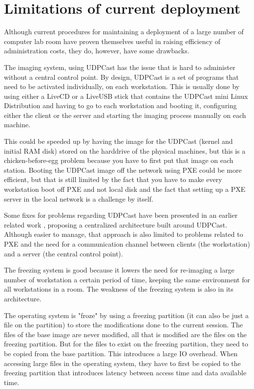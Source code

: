 \section{Limitations of current deployment}


Although current procedures for maintaining a deployment of a large
number of computer lab room have proven themselves useful in raising
efficiency of administration costs, they do, however, have some
drawbacks.

The imaging system, using UDPCast has the issue that is hard to
administer without a central control point. By design, UDPCast is a set
of programs that need to be activated individually, on each workstation.
This is usually done by using either a LiveCD or a LiveUSB stick that
contains the UDPCast mini Linux Distribution and having to go to each
workstation and booting it, configuring either the client or the server
and starting the imaging process manually on each machine.

This could be speeded up by having the image for the UDPCast (kernel and
initial RAM disk) stored on the harddrive of the physical machines, but
this is a chicken-before-egg problem because you have to first put that
image on each station. Booting the UDPCast image off the network using
PXE could be more efficient, but that is still limited by the fact that
you have to make every workstation boot off PXE and not local disk and
the fact that setting up a PXE server in the local network is a
challenge by itself.

Some fixes for problems regarding UDPCast have been presented in an
earlier related work \cite{paper:me}, proposing a centralized
architecture built around UDPCast. Although easier to manage, that
approach is also limited to problems related to \ac{PXE} and the need
for a communication channel between clients (the workstation) and a
server (the central control point).


The freezing system is good because it lowers the need for re-imaging a
large number of workstation a certain period of time, keeping the same
environment for all workstations in a room. The weakness of the freezing
system is also in its architecture.

The operating system is "froze" by using a freezing partition (it can
also be just a file on the partition) to store the modifications done to
the current session. The files of the base image are never modified, all
that is modified are the files on the freezing partition. But for the
files to exist on the freezing partition, they need to be copied from
the base partition. This introduces a large IO overhead. When accessing
large files in the operating system, they have to first be copied to the
freezing partition that introduces latency between access time and data
available time.


